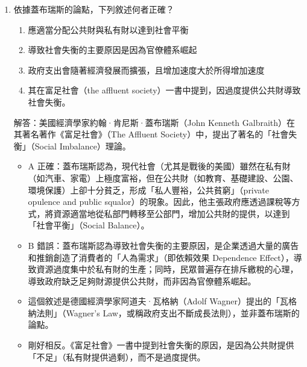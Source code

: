 \documentclass[12pt, a4paper]{article}
\begin{document}
\begin{enumerate}
    \item 依據蓋布瑞斯的論點，下列敘述何者正確？
        \begin{enumerate}[label=\Alph*.]
            \item 應適當分配公共財與私有財以達到社會平衡
            \item 導致社會失衡的主要原因是因為官僚體系崛起
            \item 政府支出會隨著經濟發展而擴張，且增加速度大於所得增加速度
            \item 其在富足社會（the affluent society）一書中提到，因過度提供公共財導致社會失衡。
        \end{enumerate}
        解答：美國經濟學家約翰·肯尼斯·蓋布瑞斯（John Kenneth Galbraith）在其著名著作《富足社會》（The Affluent Society）中，提出了著名的「社會失衡」（Social Imbalance）理論。
        \begin{itemize}
            \item A 正確：蓋布瑞斯認為，現代社會（尤其是戰後的美國）雖然在私有財（如汽車、家電）上極度富裕，但在公共財（如教育、基礎建設、公園、環境保護）上卻十分貧乏，形成「私人豐裕，公共貧窮」（private opulence and public squalor）的現象。因此，他主張政府應透過課稅等方式，將資源適當地從私部門轉移至公部門，增加公共財的提供，以達到「社會平衡」（Social Balance）。
            \item B 錯誤：蓋布瑞斯認為導致社會失衡的主要原因，是企業透過大量的廣告和推銷創造了消費者的「人為需求」（即依賴效果 Dependence Effect），導致資源過度集中於私有財的生產；同時，民眾普遍存在排斥繳稅的心理，導致政府缺乏足夠財源提供公共財，而非因為官僚體系崛起。
            \item 這個敘述是德國經濟學家阿道夫·瓦格納（Adolf Wagner）提出的「瓦格納法則」（Wagner's Law，或稱政府支出不斷成長法則），並非蓋布瑞斯的論點。
            \item 剛好相反。《富足社會》一書中提到社會失衡的原因，是因為公共財提供「不足」（私有財提供過剩），而不是過度提供。
        \end{itemize}


\end{enumerate}
\end{document}
